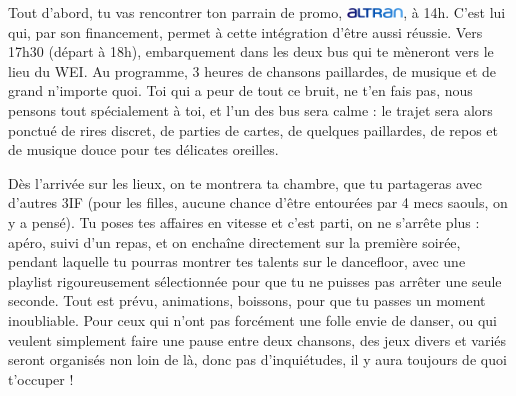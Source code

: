 Tout d'abord, tu vas rencontrer ton parrain de promo,
     \includegraphics[height=7.5pt]{images/logoAltran.jpg}, à 14h.
C'est lui qui,
par son financement, permet à cette intégration d'être aussi réussie.
Vers 17h30 (départ à 18h), embarquement dans les deux bus qui te mèneront vers le lieu du
WEI. Au programme, 3 heures de chansons paillardes, de musique et de grand
n'importe quoi.
Toi qui a peur de tout ce bruit, ne t'en fais pas, nous pensons tout
spécialement à toi, et l'un des bus sera calme : le trajet sera alors ponctué de
rires discret, de parties de cartes, de quelques paillardes, de repos et de
musique douce pour tes délicates oreilles.

Dès l'arrivée sur les lieux, on te montrera ta chambre, que tu partageras avec
d'autres 3IF (pour les filles, aucune chance d'être entourées par 4 mecs saouls,
on y a pensé). Tu poses tes affaires en vitesse et c'est parti, on ne s'arrête
plus : apéro, suivi d'un repas, et on enchaîne directement sur la première
soirée, pendant laquelle tu pourras montrer tes talents sur le dancefloor, avec
une playlist rigoureusement sélectionnée pour que tu ne puisses pas arrêter une
seule seconde. Tout est prévu, animations, boissons, pour que tu passes un
moment inoubliable. Pour ceux qui n'ont pas forcément une folle envie de danser, ou
qui veulent simplement faire une pause entre deux chansons, des jeux divers et variés seront
organisés non loin de là, donc pas d'inquiétudes, il y aura toujours de quoi t'occuper !
  
